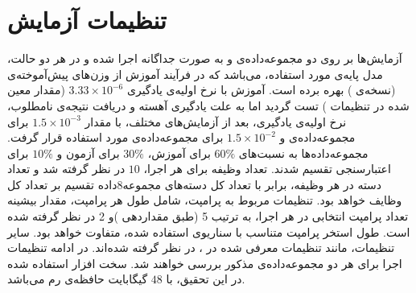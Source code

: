 \section{تنظیمات آزمایش}
آزمایش‌ها بر روی دو مجموعه‌داده‌ی \cite{hmdb51} و \cite{ucf101} به صورت جداگانه اجرا شده و در هر دو حالت، مدل پایه‌ی مورد استفاده،  \cite{open-vclip} می‌باشد که در فرآیند آموزش از وزن‌های پیش‌آموخته‌ی  \cite{clip} (نسخه‌ی ) بهره برده است. آموزش با نرخ اولیه‌ی یادگیری $3.33 \times 10^{-6}$ (مقدار معین شده در تنظیمات ) تست گردید اما به علت یادگیری آهسته و دریافت نتیجه‌ی نامطلوب، نرخ اولیه‌ی یادگیری، بعد از آزمایش‌های مختلف، با مقدار $1.5 \times 10^{-3}$ برای مجموعه‌داده‌ی  و $1.5 \times 10^{-2}$ برای مجموعه‌داده‌ی  مورد استفاده قرار گرفت. مجموعه‌داده‌ها به نسبت‌های $60\%$ برای آموزش، $30\%$ برای آزمون و $10\%$ برای اعتبارسنجی تقسیم شدند. تعداد وظیفه‌‌ برای هر اجرا، $10$ در نظر گرفته شد و تعداد دسته‌‌ در هر وظیفه‌، برابر با تعداد کل ‌دسته‌‌های مجموعه8‌داده تقسیم بر تعداد کل وظایف خواهد بود. تنظیمات مربوط به پرامپت، شامل طول هر پرامپت، مقدار بیشینه‌ تعداد پرامپت انتخابی در هر اجرا، به ترتیب 5 (طبق مقداردهی  \cite{l2p})و 2 در نظر گرفته شده است.  طول استخر پرامپت متناسب با سناریوی استفاده شده، متفاوت خواهد بود. سایر تنظیمات، مانند تنظیمات معرفی شده در ، در نظر گرفته شده‌اند. در ادامه تنظیمات اجرا برای هر دو مجموعه‌داده‌ی مذکور بررسی خواهند شد. سخت افزار استفاده شده در این تحقیق،  با $48$ گیگابایت حافظه‌ی رم می‌باشد. 
